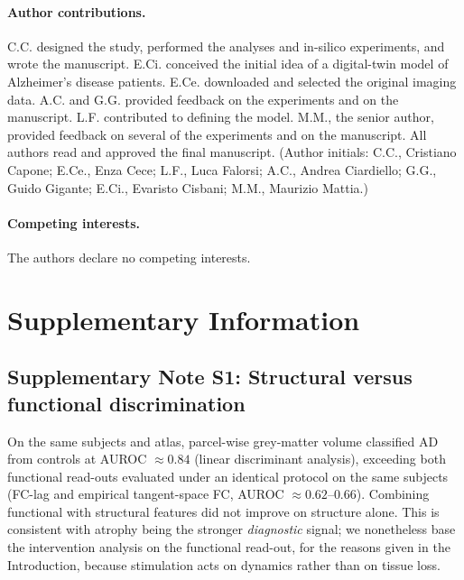 \documentclass[11pt]{article}
\newcommand{\beginsupplement}{%
  \setcounter{table}{0}\renewcommand{\thetable}{S\arabic{table}}%
  \setcounter{figure}{0}\renewcommand{\thefigure}{S\arabic{figure}}}
\begin{document}
\paragraph{Author contributions.}
C.C. designed the study, performed the analyses and in-silico experiments, and
wrote the manuscript. E.Ci. conceived the initial idea of a digital-twin model of
Alzheimer's disease patients. E.Ce. downloaded and selected the original imaging
data. A.C. and G.G. provided feedback on the experiments and on the manuscript.
L.F. contributed to defining the model. M.M., the senior author, provided
feedback on several of the experiments and on the manuscript. All authors read
and approved the final manuscript.
(Author initials: C.C., Cristiano Capone; E.Ce., Enza Cece; L.F., Luca Falorsi;
A.C., Andrea Ciardiello; G.G., Guido Gigante; E.Ci., Evaristo Cisbani;
M.M., Maurizio Mattia.)

\paragraph{Competing interests.}
The authors declare no competing interests.

\clearpage



\clearpage
\beginsupplement
\section*{Supplementary Information}

\subsection*{Supplementary Note S1: Structural versus functional discrimination}
On the same subjects and atlas, parcel-wise grey-matter volume classified AD from
controls at AUROC $\approx0.84$ (linear discriminant analysis), exceeding both
functional read-outs evaluated under an identical protocol on the same subjects
(FC-lag and empirical tangent-space FC, AUROC
$\approx0.62$--$0.66$). Combining functional with
structural features did not improve on structure alone. This is consistent with
atrophy being the stronger \emph{diagnostic} signal; we nonetheless base the
intervention analysis on the functional read-out, for the reasons given in the
Introduction, because stimulation acts on dynamics rather than on tissue loss.
\end{document}
